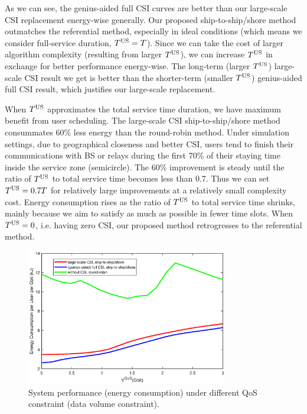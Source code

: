 \documentclass[conference]{IEEEtran}
\begin{document}
 As we can see, the genius-aided full CSI curves are better than our large-scale CSI replacement energy-wise generally. Our proposed ship-to-ship/shore method outmatches the referential method, especially in ideal conditions (which means we consider full-service duration, ${T^{\rm{US}}}=T$). 
 Since we can take the cost of larger algorithm complexity (resulting from larger $T^{\rm{US}}$), we can increase  $T^{\rm{US}}$ in exchange for better performance energy-wise. The long-term (larger $T^{\rm{US}}$) large-scale CSI result we get is better than the shorter-term (smaller $T^{\rm{US}}$) genius-aided full CSI result, which justifies our large-scale replacement. 
 
 When ${T^{\rm{US}}}$ approximates the total service time duration, we have maximum benefit from user scheduling. The large-scale CSI ship-to-ship/shore method consummates 60\% less energy than the round-robin method. 
 Under simulation settings, due to geographical closeness and better CSI, users tend to finish their communications with BS or relays during the first 70\% of their staying time inside the service zone (semicircle). The 60\% improvement is steady until the ratio of ${T^{\rm{US}}}$ to total service time becomes less than 0.7. Thus we can set ${T^{\rm{US}}=0.7T}$ for relatively large improvements at a relatively small complexity cost. 
 Energy consumption rises as the ratio of ${T^{\rm{US}}}$ to total service time shrinks, mainly because we aim to satisfy as much as possible in fewer time slots. When ${T^{\rm{US}}} = 0$, i.e. having zero CSI, our proposed method retrogresses to the referential method. 
 
 
 
 \begin{figure} [htb]
 \begin{center}
 \includegraphics*[width=8.8cm]{Cqos.eps}
 \end{center}
 \vspace*{-4mm} 
 \caption{System performance (energy consumption) under different QoS constraint (data volume constraint).}\label{fig:3}
 \vspace*{-2mm} 
 \end{figure}
 
\end{document}
